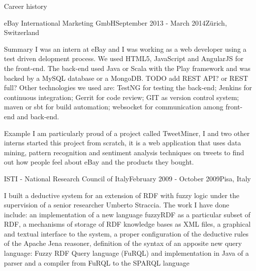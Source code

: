 \documentclass{resume}
\begin{document}
\begin{rSection}{Career history}
    \begin{rSubsection}{eBay International Marketing GmbH}{September 2013 - March 2014}{}{Z\"urich, Switzerland}
	  \item[Summary]  
	    I was an intern at eBay and I was working as a web developer using a test driven delopment process. 
	    We used HTML5, JavaScript and AngularJS for the front-end. 
	    The back-end used Java or Scala with the Play framework and was backed by a MySQL database or a MongoDB. 
	    TODO add REST API? or REST full?
	    Other technologies we used are: 
	    	TestNG for testing the back-end; 
		Jenkins for continuous integration; 
		Gerrit for code review; 
	    	GIT as version control system; 
		maven or sbt for build automation;
		websocket for communication among front-end and back-end.	  
	  \item[Example]
	    I am particularly proud of a project called TweetMiner, 
	    I and two other interns started this project from scratch,
	    it is a web application that uses data mining, pattern recognition and sentiment analysis techniques on tweets to find out how people feel about eBay and the products they bought. 
    \end{rSubsection}

    \begin{rSubsection}{ISTI - National Research Council of Italy}{February 2009 - October 2009}{}{Pisa, Italy}
      \item
	I built a deductive system for an extension of RDF with fuzzy logic under the supervision of a senior researcher Umberto Straccia.
	The work I have done include:
	an implementation of a new language fuzzyRDF as a particular subset of RDF,
        a mechanisms of storage of RDF knowledge bases as XML files,
        a graphical and textual interface to the system,
	a proper configuration of the deductive rules of the Apache Jena reasoner,
        definition of the syntax of an apposite new query language: Fuzzy RDF Query language (FuRQL)
	and implementation in Java of a parser and a compiler from FuRQL to the SPARQL language \\ 
    \end{rSubsection}
  \end{rSection}
\end{document}
